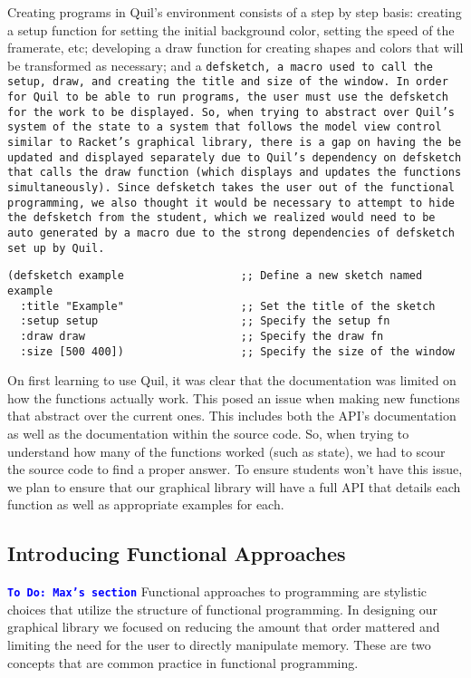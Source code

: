 \documentclass[12pt]{article}
\newcommand{\comment}[1]{{\bf \tt  {#1}}}
\newcommand{\todo}[1]{\textcolor{blue}{\comment{To Do: {#1}}}}
\begin{document}
Creating programs in Quil’s environment consists of a step by step basis: creating a setup function for setting the initial background color, setting the speed of the framerate, etc; developing a draw function for creating shapes and colors that will be transformed as necessary; and a \tt{defsketch}, a macro used to call the setup, draw, and creating the title and size of the window. In order for Quil to be able to run programs, the user must use the \tt{defsketch} for the work to be displayed. So, when trying to abstract over Quil’s system of the state to a system that follows the model view control similar to Racket’s graphical library, there is a gap on having the be updated and displayed separately due to Quil’s dependency on \tt{defsketch} that calls the draw function (which displays and updates the functions simultaneously).  Since \tt{defsketch} takes the user out of the functional programming, we also thought it would be necessary to attempt to hide the \tt{defsketch} from the student, which we realized would need to be auto generated by a macro due to the strong dependencies of \tt{defsketch} set up by Quil.
\begin{verbatim} 
(defsketch example                  ;; Define a new sketch named example
  :title "Example"                  ;; Set the title of the sketch
  :setup setup                      ;; Specify the setup fn
  :draw draw                        ;; Specify the draw fn
  :size [500 400])                  ;; Specify the size of the window
\end{verbatim}
On first learning to use Quil, it was clear that the documentation was limited on how the functions actually work. This posed an issue when making new functions that abstract over the current ones. This includes both the API’s documentation as well as the documentation within the source code. So, when trying to understand how many of the functions worked (such as state), we had to scour the source code to find a proper answer. To ensure students won’t have this issue, we plan to ensure that our graphical library will have a full API that details each function as well as appropriate examples for each.  


\subsection{Introducing Functional Approaches}\label{subsec:functional}
\todo{Max's section}
Functional approaches to programming are stylistic choices that utilize the structure of functional programming. In designing our graphical library we focused on reducing the amount that order mattered and limiting the need for the user to directly manipulate memory. These are two concepts that are common practice in functional programming.
\end{document}
